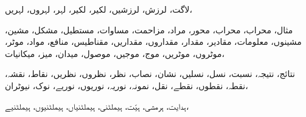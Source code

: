                                                                                                                                                                                                                                     لاگت،            لرزش،            لرزشیں،            لکیر،            لکیر،            لہر،            لہروں،            لہریں،
                                                                                                                                                                                                                                    
                                                                                                                                                                                                                                                مثال،            محراب،            محراب،            محور،            مراد،            مزاحمت،            مساوات،            مستطیل،            مشکل،            مشین،            مشینوں،            معلومات،            مقادیر،            مقدار،            مقداروں،            مقداریں،            مقناطیس،            منافع،            مواد،            موٹر،            موٹروں،            موٹریں،            موج،            موجیں،            موصول،            میدان،            میز،            میکانیات،
                                                                                                                                                                                                                                                
                                                                                                                                                                                                                                                            نتائج،            نتیجہ،            نسبت،            نسل،            نسلیں،            نشان،            نصاب،            نظر،            نظروں،            نظریں،            نقاط،            نقشہ،            نقطہ،            نقطوں،            نقطے،            نقل،            نمونہ،            نوریہ،            نوریوں،            نوریے،            نوک،            نیوٹران،
                                                                                                                                                                                                                                                            
                                                                                                                                                                                                                                                                        ہدایت،            ہرمشی،            ہیّت،            ہیملٹنی،            ہیملٹنیاں،            ہیملٹنیوں،            ہیملٹنیے،            
                                                                                                                                                                                                                                                                        
